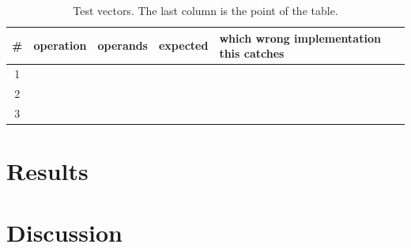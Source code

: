 \begin{table}[htbp]
\centering
\caption{Test vectors. The last column is the point of the table.}
\label{tab:lab05-vectors}
\begin{tabular}{clllp{5cm}}
\toprule
\# & operation & operands & expected & which wrong implementation this catches \\
\midrule
1 & & & & \\
2 & & & & \\
3 & & & & \\
\bottomrule
\end{tabular}
\end{table}

\section{Results}




\section{Discussion}
%
